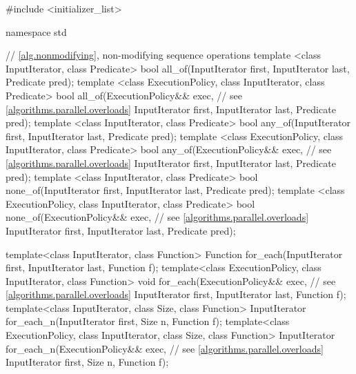 \begin{codeblock}
#include <initializer_list>

namespace std {
  // \ref{alg.nonmodifying}, non-modifying sequence operations
  template <class InputIterator, class Predicate>
    bool all_of(InputIterator first, InputIterator last, Predicate pred);
  template <class ExecutionPolicy, class InputIterator, class Predicate>
    bool all_of(ExecutionPolicy&& exec, // see \ref{algorithms.parallel.overloads}
                InputIterator first, InputIterator last, Predicate pred);
  template <class InputIterator, class Predicate>
    bool any_of(InputIterator first, InputIterator last, Predicate pred);
  template <class ExecutionPolicy, class InputIterator, class Predicate>
    bool any_of(ExecutionPolicy&& exec, // see \ref{algorithms.parallel.overloads}
                InputIterator first, InputIterator last, Predicate pred);
  template <class InputIterator, class Predicate>
    bool none_of(InputIterator first, InputIterator last, Predicate pred);
  template <class ExecutionPolicy, class InputIterator, class Predicate>
    bool none_of(ExecutionPolicy&& exec, // see \ref{algorithms.parallel.overloads}
                 InputIterator first, InputIterator last, Predicate pred);

  template<class InputIterator, class Function>
    Function for_each(InputIterator first, InputIterator last, Function f);
  template<class ExecutionPolicy, class InputIterator, class Function>
    void for_each(ExecutionPolicy&& exec, // see \ref{algorithms.parallel.overloads}
                  InputIterator first, InputIterator last, Function f);
  template<class InputIterator, class Size, class Function>
    InputIterator for_each_n(InputIterator first, Size n, Function f);
  template<class ExecutionPolicy, class InputIterator, class Size, class Function>
    InputIterator for_each_n(ExecutionPolicy&& exec, // see \ref{algorithms.parallel.overloads}
                             InputIterator first, Size n, Function f);

}
\end{codeblock}
